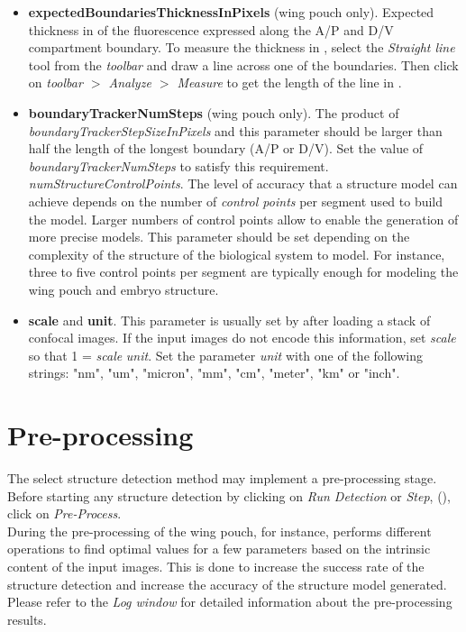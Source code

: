 \begin{itemize}
 \item \textbf{expectedBoundariesThicknessInPixels} (\droso wing pouch only). Expected thickness in \px of the fluorescence expressed along the A/P and D/V compartment boundary. To measure the thickness in \px, select the \textit{Straight line} tool from the \textit{\ij toolbar} and draw a line across one of the boundaries. Then click on \textit{\ij toolbar $>$ Analyze $>$ Measure} to get the length of the line in \px.
 \item \textbf{boundaryTrackerNumSteps} (\droso wing pouch only). The product of \textit{boundaryTrackerStepSizeInPixels} and this parameter should be larger than half the length of the longest boundary (A/P or D/V). Set the value of \textit{boundaryTrackerNumSteps} to satisfy this requirement.
 \textit{numStructureControlPoints}. The level of accuracy that a structure model can achieve depends on the number of \emph{control points} per segment used to build the model. Larger numbers of control points allow to enable the generation of more precise models. This parameter should be set depending on the complexity of the structure of the biological system to model. For instance, three to five control points per segment are typically enough for modeling the wing pouch and embryo structure.
 \item \textbf{scale} and \textbf{unit}. This parameter is usually set by \wingj after loading a stack of confocal images. If the input images do not encode this information, set \textit{scale} so that 1 \px = \textit{scale} \textit{unit}. Set the parameter \textit{unit} with one of the following strings: "nm", "um", "micron", "mm", "cm", "meter", "km" or "inch".
\end{itemize}

\section{Pre-processing} \label{sec:pp_parameters}
The select structure detection method may implement a pre-processing stage. Before starting any structure detection by clicking on \textit{Run Detection} or \textit{Step}, (), click on \textit{Pre-Process}.\\

During the pre-processing of the \droso wing pouch, for instance, \wingj performs different operations to find optimal values for a few parameters based on the intrinsic content of the input images. This is done to increase the success rate of the structure detection and increase the accuracy of the structure model generated. Please refer to the \textit{Log window} for detailed information about the pre-processing results.

